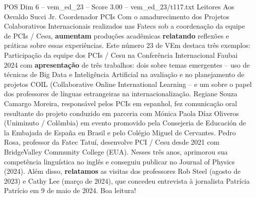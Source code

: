 \begin{textsample}{POS Dim 6 – vem\_ed\_23 – Score 3.00 – vem\_ed\_23/t117.txt}  \label{ex:f6_pos_126}
Leitores Aos Osvaldo Succi Jr.
Coordenador PCIs Com o amadurecimento dos Projetos Colaborativos Internacionais realizados nas Fatecs sob a coordenação da equipe de PCIs / Cesu, \textbf{aumentam} produções acadêmicas \textbf{relatando} reflexões e práticas sobre essas experiências.
Este número 23 de VEm destaca três exemplos: Participação da equipe dos PCIs / Cesu na Conferência Internacional Faubai 2024 com \textbf{apresentação} de três trabalhos: dois sobre temas emergentes – uso de técnicas de Big Data e Inteligência Artificial na avaliação e no planejamento de projetos COIL (Collaborative Online International Learning – e um sobre o papel dos professores de línguas estrangeiras na internacionalização.
Regiane Souza Camargo Moreira, responsável pelos PCIs em espanhol, fez comunicação oral resultante do projeto conduzido em parceria com Mónica Paola Díaz Oliveros (Uniminuto / Colômbia) em evento promovido pela Consejeria de Educación de la Embajada de España en Brasil e pelo Colégio Miguel de Cervantes.
Pedro Rosa, professor da Fatec Tatuí, desenvolve PCI / Cesu desde 2021 com BridgeValley Community College (EUA).
Nesses três anos, aprimorou sua competência linguística no inglês e conseguiu publicar no Journal of Physics (2024).
Além disso, \textbf{relatamos} as visitas dos professores Rob Steel (agosto de 2023) e Cathy Lee (março de 2024), que concedeu entrevista à jornalista Patrícia Patrício em 9 de maio de 2024.
Boa leitura!

\end{textsample}

